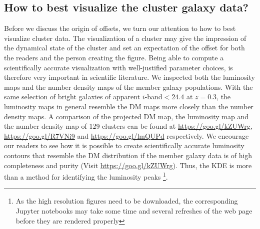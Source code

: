 \subsection{How to best visualize the cluster galaxy data?}
Before we discuss the origin of offsets, we turn our attention to how to best
visualize cluster data. The visualization of a cluster may give
the impression of the dynamical state of the cluster and set an expectation of
the offset for both the readers and the person creating the figure. 
Being able to compute a scientifically accurate visualization
with well-justified parameter choices, is therefore very important in scientific literature.
We inspected both the luminosity maps and the
number density maps of the member galaxy populations.
With the same selection of bright galaxies of apparent $i$-band$ < 24.4$ at
$z=0.3$, the luminosity maps in general resemble the DM maps more closely than 
the number density maps.
A comparison of the projected 
DM map, the luminosity map and the number density map of 129 clusters 
can be found at \href{https://goo.gl/kZUWrg}{https://goo.gl/kZUWrg}, 
\href{https://goo.gl/R7VNi9}{https://goo.gl/R7VNi9} and
\href{https://goo.gl/lmQUPd}{https://goo.gl/lmQUPd} respectively. 
We encourage our readers to see how it is possible
to create scientifically accurate luminosity contours 
that resemble 
the DM distribution if the member galaxy
data is of high completeness and purity (Visit
\href{https://goo.gl/kZUWrg}{https://goo.gl/kZUWrg}). Thus, 
the KDE is more than a method for
identifying the luminosity peaks
\footnote{As the high resolution figures need to be downloaded, the 
corresponding Jupyter notebooks may take some time and several refreshes of the
web page before they are rendered properly}.

% 

